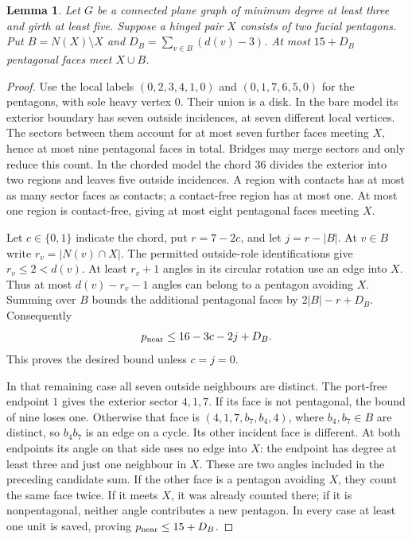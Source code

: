 \documentclass[11pt]{article}
\newtheorem{lemma}[theorem]{Lemma}
\theoremstyle{remark}
\numberwithin{equation}{section}
\numberwithin{table}{section}
\begin{document}
\begin{lemma}\label{lem:hinged-neighbourhood}
Let $G$ be a connected plane graph of minimum degree at least three and
girth at least five. Suppose a hinged pair $X$ consists of two facial
pentagons. Put $B=N(X)\setminus X$ and
$D_B=\sum_{v\in B}(d(v)-3)$. At most $15+D_B$ pentagonal faces meet
$X\cup B$.
\end{lemma}
\begin{proof}
Use the local labels $(0,2,3,4,1,0)$ and $(0,1,7,6,5,0)$ for the
pentagons, with sole heavy vertex $0$. Their union is a disk. In the
bare model its exterior boundary has seven outside incidences, at
seven different local vertices. The sectors between them account for
at most seven further faces meeting $X$, hence at most nine pentagonal
faces in total. Bridges may merge sectors and only reduce this count.
In the chorded model the chord $36$ divides the exterior into two
regions and leaves five outside incidences. A region with contacts
has at most as many sector faces as contacts; a contact-free region
has at most one. At most one region is contact-free, giving at most
eight pentagonal faces meeting $X$.

Let $c\in\{0,1\}$ indicate the chord, put $r=7-2c$, and let
$j=r-|B|$. At $v\in B$ write $r_v=|N(v)\cap X|$. The permitted
outside-role identifications give $r_v\le2<d(v)$. At least $r_v+1$
angles in its circular rotation use an edge into $X$. Thus at most
$d(v)-r_v-1$ angles can belong to a pentagon avoiding $X$. Summing
over $B$ bounds the additional pentagonal faces by
$2|B|-r+D_B$. Consequently
\[
 p_{\rm near}\le16-3c-2j+D_B.
\]
This proves the desired bound unless $c=j=0$.

In that remaining case all seven outside neighbours are distinct.
The port-free endpoint $1$ gives the exterior sector $4,1,7$. If
its face is not pentagonal, the bound of nine loses one. Otherwise
that face is $(4,1,7,b_7,b_4,4)$, where $b_4,b_7\in B$ are distinct,
so $b_4b_7$ is an edge on a cycle. Its other incident face is different.
At both endpoints its angle on that side uses no edge into $X$:
the endpoint has degree at least three and just one neighbour in $X$.
These are two angles included in the preceding candidate sum. If the
other face is a pentagon avoiding $X$, they count the same face twice.
If it meets $X$, it was already counted there; if it is nonpentagonal,
neither angle contributes a new pentagon. In every case at least one
unit is saved, proving $p_{\rm near}\le15+D_B$.
\end{proof}
\end{document}
